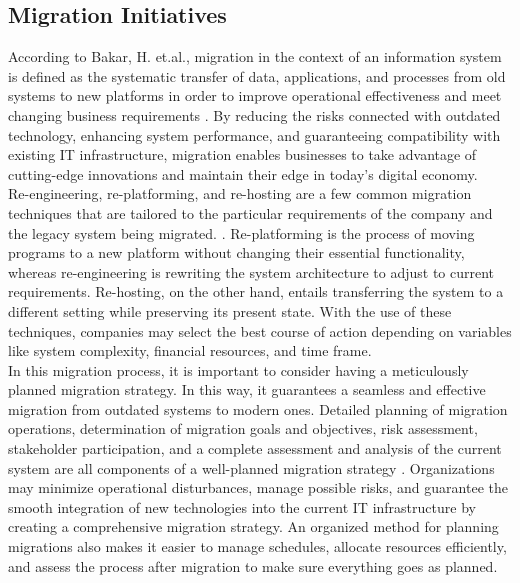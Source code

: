     \subsection{Migration Initiatives}
        According to Bakar, H. et.al.,  migration in the context of an information system is defined as the systematic transfer of data, applications, and processes from old systems to new platforms in order to improve operational effectiveness and meet changing business requirements \cite{hrd12022}. By reducing the risks connected with outdated technology, enhancing system performance, and guaranteeing compatibility with existing IT infrastructure, migration enables businesses to take advantage of cutting-edge innovations and maintain their edge in today's digital economy.
        \\
        
        Re-engineering, re-platforming, and re-hosting are a few common migration techniques that are tailored to the particular requirements of the company and the legacy system being migrated. \cite{hrd12020}. Re-platforming is the process of moving programs to a new platform without changing their essential functionality, whereas re-engineering is rewriting the system architecture to adjust to current requirements. Re-hosting, on the other hand, entails transferring the system to a different setting while preserving its present state. With the use of these techniques, companies may select the best course of action depending on variables like system complexity, financial resources, and time frame.
        \\
        
        In this migration process, it is important to consider having a meticulously planned migration strategy. In this way, it guarantees a seamless and effective migration from outdated systems to modern ones. Detailed planning of migration operations, determination of migration goals and objectives, risk assessment, stakeholder participation, and a complete assessment and analysis of the current system are all components of a well-planned migration strategy \cite{hrd12021}. Organizations may minimize operational disturbances, manage possible risks, and guarantee the smooth integration of new technologies into the current IT infrastructure by creating a comprehensive migration strategy. An organized method for planning migrations also makes it easier to manage schedules, allocate resources efficiently, and assess the process after migration to make sure everything goes as planned.


